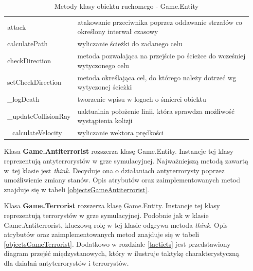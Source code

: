 \begin{table}
\begin{center}
\begin{tabular}{|p{}|p{}|}
	attack & atakowanie przeciwnika poprzez oddawanie strzałów co określony interwał czasowy\\
	calculatePath & wyliczanie ścieżki do zadanego celu\\
	checkDirection & metoda pozwalająca na przejście po ścieżce do wcześniej wytyczonego celu\\
	setCheckDirection & metoda określająca cel, do którego należy dotrzeć wg wytyczonej ścieżki\\
	\_logDeath & tworzenie wpisu w logach o śmierci obiektu\\
	\_updateCollisionRay & uaktualnia położenie linii, która sprawdza możliwość wystąpienia kolizji\\
	\_calculateVelocity & wyliczanie wektora prędkości
\\\hline
\end{tabular}
\caption {Metody klasy obiektu ruchomego - Game.Entity\label{objectsGameEntityFuncs}}
\end{center}
\end{table} 

Klasa \textbf{Game.Antiterrorist} rozszerza klasę Game.Entity. Instancje tej klasy reprezentują antyterrorystów w grze symulacyjnej. Najważniejszą metodą zawartą w~tej klasie jest \emph{think}. Decyduje ona o działaniach antyterrorysty poprzez umożliwienie zmiany stanów. Opis atrybutów oraz zaimplementowanych metod znajduje się w tabeli \ref{objectsGameAntiterrorist}.

Klasa \textbf{Game.Terrorist} rozszerza klasę Game.Entity. Instancje tej klasy reprezentują terrorystów w grze symulacyjnej. Podobnie jak w klasie Game.Antiterrorist, kluczową rolę w tej klasie odgrywa metoda \emph{think}. Opis atrybutów oraz zaimplementowanych metod znajduje się w tabeli \ref{objectsGameTerrorist}. Dodatkowo w rozdziale \ref{tacticts} jest przedstawiony diagram przejść międzystanowych, który w ilustruje taktykę charakterystyczną dla działań antyterrorystów i terrorystów. 

